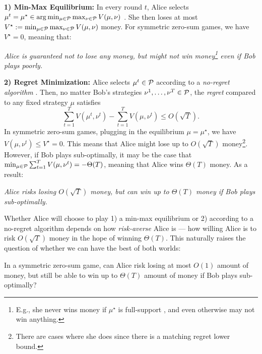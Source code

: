 \documentclass[11pt]{article}
\begin{document}
\textbf{1) Min-Max Equilibrium:} In every round $t$, Alice selects $\mu^t = \mu^\star \in \arg\min_{\mu 
\in \mathcal{P}}\max_{\nu \in \mathcal{P}} V(\mu,\nu)$ \citep{von2007theory}. She then loses at most $V^\star := \min_{\mu \in \mathcal{P}}\max_{\nu \in \mathcal{P}} V(\mu,\nu)$ money. For symmetric zero-sum games, we have $V^\star = 0$, meaning that:

\smallskip
\smallskip
\begin{center}
    \textit{Alice is guaranteed not to lose any money, but might not win money\footnote{E.g., she never wins money if $\mu^\star$ is full-support \citep{braggion2020strong}, and even otherwise may not win anything.} even if Bob plays poorly.}
\end{center}
\smallskip
\smallskip

\textbf{2) Regret Minimization:} Alice selects $\mu^t \in \mathcal{P}$ according to a \emph{no-regret algorithm} \cite{cesa2006prediction}. Then, no matter Bob's strategies
$\nu^1,\ldots,\nu^T \in \mathcal{P}$, the \textit{regret} compared to any fixed strategy $\mu$ satisfies
\begin{equation*}
    \sum_{t=1}^T V(\mu^t,\nu^t) - \sum_{t=1}^T V(\mu,\nu^t)\leq O(\sqrt{T}).
\end{equation*}
In symmetric zero-sum games, plugging in the equilibrium $\mu=\mu^\star$, we have $V(\mu,\nu^t)\leq V^\star = 0$. This means that Alice might lose up to $O(\sqrt{T})$ 
money\footnote{There are cases where she does since there is a matching regret lower bound.}. However, if Bob plays sub-optimally, it may be the case that $\min_{\mu \in \mathcal{P}} \sum_{t=1}^T V(\mu,\nu^t) = -\Theta(T)$, meaning that Alice wins $\Theta(T)$ money. As a result:

\smallskip
\smallskip
\begin{center}
    \textit{Alice risks losing $O(\sqrt{T})$ money, but can win up to $\Theta(T)$ money if Bob plays sub-optimally.} 
\end{center}
\smallskip
\smallskip

\noindent Whether Alice will choose to play 1) a min-max equilibrium or 2) according to a no-regret algorithm depends on how \emph{risk-averse} Alice is --- how willing Alice is to risk $O(\sqrt{T})$ money in the hope of winning $\Theta(T)$. This naturally raises the question of whether we can have the best of both worlds:
\begin{question}\label{q:1}
    In a symmetric zero-sum game, can Alice risk losing at most $O(1)$ amount of money, but still be able to win up to $\Theta(T)$ amount of money if Bob plays sub-optimally?
\end{question}
\end{document}
